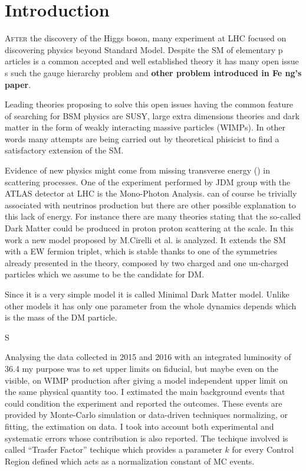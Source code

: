 \chapter{Introduction}
\lettrine{A}{fter} the discovery of the Higgs boson, many experiment at LHC focused on discovering physics beyond Standard Model. Despite the SM of elementary p articles is a common accepted and well established theory it has many open issue s such the gauge hierarchy problem and {\bfseries other problem introduced in Fe ng's paper}.
  
  Leading theories proposing to solve this open issues having the common feature of searching for BSM physics are SUSY, large extra dimensions theories and dark matter in the form of weakly interacting massive particles (WIMPs). In other words many attempts are being carried out by theoretical phisicist to find a satisfactory extension of the SM.

  Evidence of new physics might come from missing transverse energy (\MET) in scattering processes. One of the experiment performed by JDM group with the ATLAS detector at LHC is the Mono-Photon Analysis. \MET can of course be trivially associated with neutrinos production but there are other possible explanation to this lack of energy. For instance there are many theories stating that the so-called Dark Matter could be produced in proton proton scattering at the \TeV scale. In this work a new model proposed by M.Cirelli et al. is analyzed. It extends the SM with a EW fermion triplet, which is stable thanks to one of the symmetries already presented in the theory, composed by two charged and one un-charged particles which we assume to be the candidate for DM.

  Since it is a very simple model it is called Minimal Dark Matter model. Unlike other models it has only one parameter from the whole dynamics depends which is the mass of the DM particle.
  
  S  

  Analysing the data collected in 2015 and 2016 with an integrated luminosity of 36.4 \ifb my purpose was to set upper limits on fiducial, but maybe even on the visible, on WIMP production after giving a model independent upper limit on the same physical quantity too. I extimated the main background events that could condition the experiment and reported the outcomes. These events are provided by Monte-Carlo simulation or data-driven techniques normalizing, or fitting, the extimation on data. I took into account both experimental and systematic errors whose contribution is also reported. The techique involved is called ``Trasfer Factor'' techique which provides a parameter $k$ for every Control Region defined which acts as a normalization constant of MC events. 

